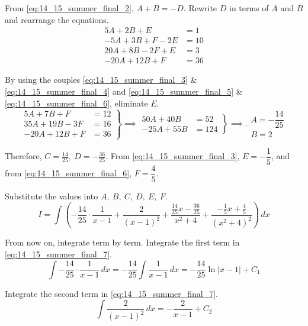 \documentclass[a4paper, 12pt]{article}
\begin{document}
\begin{enumerate}[leftmargin=*,label=\textbf{\arabic*.}]
\begin{enumerate}[leftmargin=*,label=\textbf{\alph*.}]
From \eqref{eq:14_15_summer_final_2}, $A+B=-D$. Rewrite $D$ in terms of $A$ and $B$ and rearrange the equations.
\begin{align}
5A+2B+E&=1\label{eq:14_15_summer_final_3}\\
-5A+3B+F-2E&=10\label{eq:14_15_summer_final_4}\\
20A+8B-2F+E&=3\label{eq:14_15_summer_final_5}\\
-20A+12B+F&=36\label{eq:14_15_summer_final_6}
\end{align}

By using the couples \eqref{eq:14_15_summer_final_3} \& \eqref{eq:14_15_summer_final_4} and \eqref{eq:14_15_summer_final_5} \& \eqref{eq:14_15_summer_final_6}, eliminate $E$.
\[\left.\begin{array}{rl}
5A+7B+F&=12\\
35A+19B-3F&=16\\
-20A+12B+F&=36
\end{array}\right\}\implies\left.\begin{array}{rl}
50A+40B&=52\\
-25A+55B&=124
\end{array}\right\}\implies.\begin{array}{ll}
A=-\dfrac{14}{25}\\
B=2
\end{array}
\]

Therefore, $\displaystyle C=\frac{14}{25},\:D=-\frac{36}{25}$. From \eqref{eq:14_15_summer_final_3}, $E=-\dfrac15$, and from \eqref{eq:14_15_summer_final_6}, $F=\dfrac45$.

Substitute the values into $A,\:B,\:C,\:D,\:E,\:F$.
\begin{equation}I=\int\left(-\frac{14}{25}\cdot\frac1{x-1}+\frac2{(x-1)^2}+\frac{\frac{14}{25}x-\frac{36}{25}}{x^2+4}+\frac{-\frac15x+\frac45}{\left(x^2+4\right)^2}\right)\,dx\label{eq:14_15_summer_final_7}\end{equation}

From now on, integrate term by term. Integrate the first term in \eqref{eq:14_15_summer_final_7}.
\begin{equation}\int-\frac{14}{25}\cdot\frac1{x-1}\,dx=-\frac{14}{25}\int\frac1{x-1}\,dx=-\frac{14}{25}\ln\left|x-1\right|+C_1\label{eq:14_15_summer_final_8}\end{equation}

Integrate the second term in \eqref{eq:14_15_summer_final_7}.
\begin{equation}\int\frac{2}{(x-1)^2}\,dx=-\frac2{x-1}+C_2\label{eq:14_15_summer_final_9}\end{equation}


\end{enumerate}
\end{enumerate}
\end{document}
